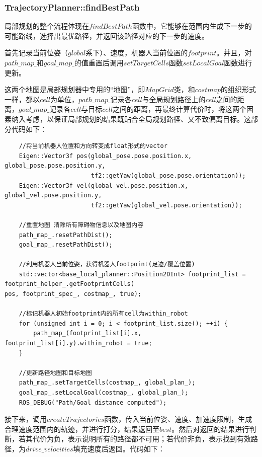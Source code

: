 \documentclass[9pt, oneside]{book}
\begin{document}
\subsubsection{TrajectoryPlanner::findBestPath}

局部规划的整个流程体现在$findBestPath$函数中，它能够在范围内生成下一步的可能路线，选择出最优路径，并返回该路径对应的下一步的速度。

首先记录当前位姿（$global$系下）、速度，机器人当前位置的$footprint$。并且，对$path\_map\_$和$goal\_map\_$的值重置后调用$setTargetCells$函数$setLocalGoal$函数进行更新。

这两个地图是局部规划器中专用的“地图”，即$MapGrid$类，和$costmap$的组织形式一样，都以$cell$为单位，$path\_map\_$记录各$cell$与全局规划路径上的$cell$之间的距离，$goal\_map\_$记录各$cell$与目标$cell$之间的距离，再最终计算代价时，将这两个因素纳入考虑，以保证局部规划的结果既贴合全局规划路径、又不致偏离目标。这部分代码如下：

\footnotesize
\begin{verbatim}
    //将当前机器人位置和方向转变成float形式的vector
    Eigen::Vector3f pos(global_pose.pose.position.x, global_pose.pose.position.y, 
                        tf2::getYaw(global_pose.pose.orientation));
    Eigen::Vector3f vel(global_vel.pose.position.x, global_vel.pose.position.y, 
                        tf2::getYaw(global_vel.pose.orientation));

    //重置地图 清除所有障碍物信息以及地图内容
    path_map_.resetPathDist();
    goal_map_.resetPathDist();

    //利用机器人当前位姿，获得机器人footpoint(足迹/覆盖位置)
    std::vector<base_local_planner::Position2DInt> footprint_list = footprint_helper_.getFootprintCells(
pos, footprint_spec_, costmap_, true);

    //标记机器人初始footprint内的所有cell为within_robot
    for (unsigned int i = 0; i < footprint_list.size(); ++i) {
        path_map_(footprint_list[i].x, footprint_list[i].y).within_robot = true;
    }

    //更新路径地图和目标地图
    path_map_.setTargetCells(costmap_, global_plan_);
    goal_map_.setLocalGoal(costmap_, global_plan_);
    ROS_DEBUG("Path/Goal distance computed");
\end{verbatim}
\normalsize

接下来，调用$createTrajectories$函数，传入当前位姿、速度、加速度限制，生成合理速度范围内的轨迹，并进行打分，结果返回至$best$。然后对返回的结果进行判断，若其代价为负，表示说明所有的路径都不可用；若代价非负，表示找到有效路径，为$drive\_velocities$填充速度后返回。代码如下：
\end{document}
